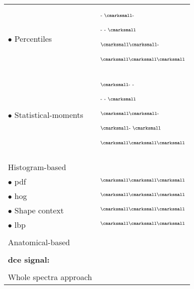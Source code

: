 \begin{longtable}{@{}l >{\raggedleft\arraybackslash}X@{}}
  \quad \quad \quad $\bullet$ Percentiles & $^{\text{- {\cmarksmall}-}}$\cite{Vos2008a} \par $^{\text{- - {\cmarksmall}}}$\cite{Antic2013,Peng2013}\par $^{\text{{\cmarksmall}{\cmarksmall}-}}$\cite{Vos2010}\par $^{\text{{\cmarksmall}{\cmarksmall}{\cmarksmall}}}$\cite{Litjens2011,Litjens2012,Litjens2014,Niaf2011,Niaf2012,Vos2012,lehaire2014computer} \\
  \quad \quad \quad $\bullet$ Statistical-moments & $^{\text{{\cmarksmall}- -}}$\cite{Ampeliotis2007,Ampeliotis2008,Tiwari2009a,Tiwari2010,Tiwari2013,Viswanath2008,Viswanath2009,Viswanath2012,rampun2016quantitative,rampun2015computer,rampun2016computer}\par $^{\text{- - {\cmarksmall}}}$\cite{Antic2013}\par $^{\text{{\cmarksmall}{\cmarksmall}-}}$\cite{Viswanath2011}\par $^{\text{{\cmarksmall}- {\cmarksmall}}}$\cite{Peng2013,cameron2014multiparametric,cameron2016maps,khalvati2015automated,chung2015prostate}\par $^{\text{{\cmarksmall}{\cmarksmall}{\cmarksmall}}}$\cite{Litjens2011,Litjens2012,Litjens2014,Niaf2011,Niaf2012,lehaire2014computer} \\ \\ [-1.5ex]
  \quad \quad Histogram-based & \\
  \quad \quad \quad $\bullet$ \acs{pdf} & $^{\text{{\cmarksmall}{\cmarksmall}{\cmarksmall}}}$\cite{Liu2013} \\
  \quad \quad \quad $\bullet$ \acs{hog} & $^{\text{{\cmarksmall}{\cmarksmall}{\cmarksmall}}}$\cite{Liu2013} \\
  \quad \quad \quad $\bullet$ Shape context & $^{\text{{\cmarksmall}{\cmarksmall}{\cmarksmall}}}$\cite{Liu2013} \\
  \quad \quad \quad $\bullet$ \acs{lbp} & $^{\text{{\cmarksmall}{\cmarksmall}{\cmarksmall}}}$\cite{Liu2013} \\ \\ [-1.5ex]
  \quad \quad Anatomical-based & \cite{Litjens2012,Litjens2014,Matulewicz2013,cameron2014multiparametric,cameron2016maps} \\ \\ [-1.5ex]
  \textbf{\acs*{dce} signal:} & \\ \\ [-1.5ex]
  \quad Whole spectra approach & \cite{Ampeliotis2007,Ampeliotis2008} \\

\end{longtable}
